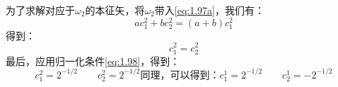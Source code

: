 为了求解对应于$\omega_2$的本征矢，将$\omega_2$带入\autoref{eq:1.97a}，我们有：
\[a c_1^2 + b c_2^2 = (a+b) c_1^2\]
得到：
\[c_1^2 = c_2^2\]
最后，应用归一化条件\autoref{eq:1.98}，得到：
\begin{subequations}
 \begin{equation}
     c_1^2 = 2^{-1/2}\qquad c_2^2 = 2^{-1/2}
     \label{eq:1.100a}
 \end{equation}
 同理，可以得到：
 \begin{equation}
     c_1^1 = 2^{-1/2}\qquad c_2^1 = -2^{-1/2}
     \label{eq:1.100b}
 \end{equation}
 \label{eq:1.100}
\end{subequations}


